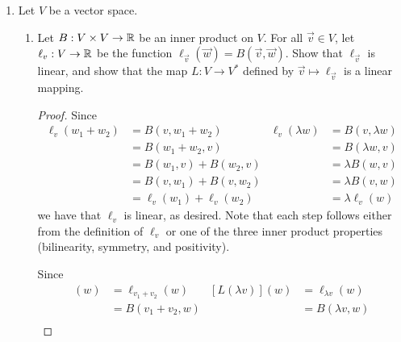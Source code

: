 \documentclass[../psets.tex]{subfiles}
\begin{document}
\begin{enumerate}[label={\textbf{1.2.\roman*.}}]
\begin{enumerate}
\begin{proof}
\begin{equation*}
\begin{cases}
                    0 & \text{otherwise}
                \end{cases}
            \end{equation*}
            Then
            \begin{align*}
                \ell(v_1) &\neq \ell(v_2)\\
                \eva_{v_1}(\ell) &\neq \eva_{v_2}(\ell)\\
                \eva(v_1)(\ell) &\neq \eva(v_2)(\ell)
            \end{align*}
            as desired.
        \end{proof}
    \end{enumerate}
    \setcounter{enumi}{10}
    \item Let $V$ be a vector space.
    \begin{enumerate}
        \item Let $B:V\times V\to\mathbb{R}$ be an inner product on $V$. For all $\vec{v}\in V$, let $\ell_v:V\to\mathbb{R}$ be the function $\ell_\vec{v}(\vec{w})=B(\vec{v},\vec{w})$. Show that $\ell_\vec{v}$ is linear, and show that the map $L:V\to V^*$ defined by $\vec{v}\mapsto\ell_\vec{v}$ is a linear mapping.
        \begin{proof}
            Since
            \begin{align*}
                \ell_v(w_1+w_2) &= B(v,w_1+w_2)&
                    \ell_v(\lambda w) &= B(v,\lambda w)\\
                &= B(w_1+w_2,v)&
                    &= B(\lambda w,v)\\
                &= B(w_1,v)+B(w_2,v)&
                    &= \lambda B(w,v)\\
                &= B(v,w_1)+B(v,w_2)&
                    &= \lambda B(v,w)\\
                &= \ell_v(w_1)+\ell_v(w_2)&
                    &= \lambda\ell_v(w)
            \end{align*}
            we have that $\ell_v$ is linear, as desired. Note that each step follows either from the definition of $\ell_v$ or one of the three inner product properties (bilinearity, symmetry, and positivity).\par
            Since
            \begin{align*}
                [L(v_1+v_2)](w) &= \ell_{v_1+v_2}(w)&
                    [L(\lambda v)](w) &= \ell_{\lambda v}(w)\\
                &= B(v_1+v_2,w)&
                    &= B(\lambda v,w)\\

\end{align*}
\end{proof}
\end{enumerate}
\end{enumerate}
\end{document}
